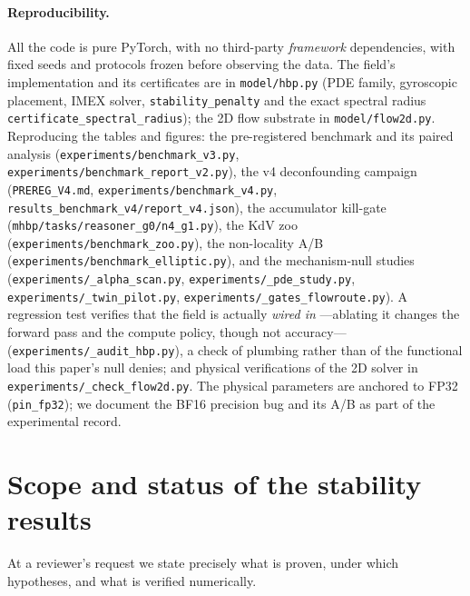 \documentclass{article}
\begin{document}
{\sloppy \paragraph{Reproducibility.} All the code is pure PyTorch, with no third-party
\emph{framework} dependencies, with fixed seeds and protocols frozen before
observing the data. The field's implementation and its certificates are in
\texttt{model/hbp.py} (PDE family, gyroscopic placement, IMEX solver,
\texttt{stability\_penalty} and the exact spectral radius
\texttt{certificate\_spectral\_radius}); the 2D flow substrate in
\texttt{model/flow2d.py}. Reproducing the tables and figures: the pre-registered
benchmark and its paired analysis (\texttt{experiments/benchmark\_v3.py},
\texttt{experiments/benchmark\_report\_v2.py}), the v4 deconfounding campaign
(\texttt{PREREG\_V4.md}, \texttt{experiments/benchmark\_v4.py},
\texttt{results\_benchmark\_v4/report\_v4.json}), the accumulator kill-gate
(\texttt{mhbp/tasks/reasoner\_g0/n4\_g1.py}), the KdV zoo (\texttt{experiments/benchmark\_zoo.py}), the
non-locality A/B (\texttt{experiments/benchmark\_elliptic.py}), and the mechanism-null studies
(\texttt{experiments/\_alpha\_scan.py}, \texttt{experiments/\_pde\_study.py}, \texttt{experiments/\_twin\_pilot.py},
\texttt{experiments/\_gates\_flowroute.py}). A regression test verifies that the field is
actually \emph{wired in} ---ablating it changes the forward pass and the
compute policy, though not accuracy--- (\texttt{experiments/\_audit\_hbp.py}), a check of
plumbing rather than of the functional load this paper's null denies; and physical verifications of the
2D solver in \texttt{experiments/\_check\_flow2d.py}. The physical parameters are anchored to
FP32 (\texttt{pin\_fp32}); we document the BF16 precision bug and its A/B as part
of the experimental record.


\appendix
\section{Scope and status of the stability results}\label{app:scope}
At a reviewer's request we state precisely what is proven, under which
hypotheses, and what is verified numerically.

}
\end{document}
